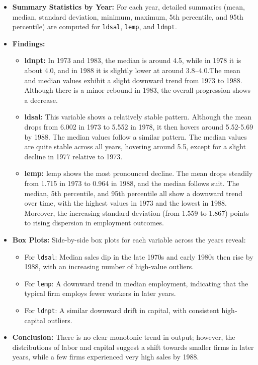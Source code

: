 \documentclass[a4paper,12pt]{article} %
\theoremstyle{nonitalic}
\newenvironment{solution}[1]
  {\renewcommand\theinnercustomsol{#1}\innercustomsol}
  {\endinnercustomsol}
\newcounter{solutionctr}
\renewcommand{\thesolutionctr}{(\alph{solutionctr})}
\newenvironment{autosolution}
  {\stepcounter{solutionctr}\begin{solution}{\thesolutionctr}}
  {\end{solution}}
\begin{document}
\begin{autosolution}
\begin{itemize}
    \item \textbf{Summary Statistics by Year:} For each year, detailed summaries (mean, median, standard deviation, minimum, maximum, 5th percentile, and 95th percentile) are computed for \texttt{ldsal}, \texttt{lemp}, and \texttt{ldnpt}.
    
    \item \textbf{Findings:}
    \begin{itemize}
        \item \textbf{ldnpt:} In 1973 and 1983, the median is around 4.5, while in 1978 it is about 4.0, and in 1988 it is slightly lower at around 3.8--4.0.The mean and median values exhibit a slight downward trend from 1973 to 1988. Although there is a minor rebound in 1983, the overall progression shows a decrease.
        \item \textbf{ldsal:} This variable shows a relatively stable pattern. Although the mean drops from 6.002 in 1973 to 5.552 in 1978, it then hovers around 5.52-5.69 by 1988. The median values follow a similar pattern. The median values are quite stable across all years, hovering around 5.5, except for a slight decline in 1977 relative to 1973.
        \item \textbf{lemp:} lemp shows the most pronounced decline. The mean drops steadily from 1.715 in 1973 to 0.964 in 1988, and the median follows suit. The median, 5th percentile, and 95th percentile all show a downward trend over time, with the highest values in 1973 and the lowest in 1988. Moreover, the increasing standard deviation (from 1.559 to 1.867) points to rising dispersion in employment outcomes. 
    \end{itemize}
    \item \textbf{Box Plots:} Side-by-side box plots for each variable across the years reveal:
    \begin{itemize}
        \item For \texttt{ldsal}: Median sales dip in the late 1970s and early 1980s then rise by 1988, with an increasing number of high-value outliers.
        \item For \texttt{lemp}: A downward trend in median employment, indicating that the typical firm employs fewer workers in later years.
        \item For \texttt{ldnpt}: A similar downward drift in capital, with consistent high-capital outliers.
    \end{itemize}
    \item \textbf{Conclusion:} There is no clear monotonic trend in output; however, the distributions of labor and capital suggest a shift towards smaller firms in later years, while a few firms experienced very high sales by 1988.
\end{itemize}


\end{autosolution}
\end{document}
